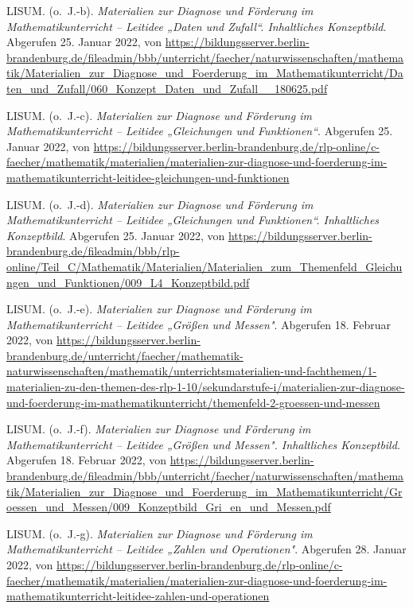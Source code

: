 \documentclass[
  ngerman,
]{scrbook}
\newlength{\cslhangindent}
\newlength{\cslentryspacingunit} %
\newenvironment{CSLReferences}[2] %
 {%
  \setlength{\parindent}{0pt}
  \ifodd #1
  \let\oldpar\par
  \def\par{\hangindent=\cslhangindent\oldpar}
  \fi
  \setlength{\parskip}{#2\cslentryspacingunit}
 }%
 {}
\theoremstyle{definition}
\theoremstyle{definition}
\theoremstyle{definition}
\theoremstyle{definition}
\theoremstyle{remark}
\begin{document}
\begin{CSLReferences}{1}{0}
\leavevmode{}%
LISUM. (o.~J.-b). \emph{Materialien zur {Diagnose} und {Förderung} im {Mathematikunterricht} -- {Leitidee} „{Daten} und {Zufall}``. {Inhaltliches} {Konzeptbild}}. Abgerufen 25. Januar 2022, von \url{https://bildungsserver.berlin-brandenburg.de/fileadmin/bbb/unterricht/faecher/naturwissenschaften/mathematik/Materialien_zur_Diagnose_und_Foerderung_im_Mathematikunterricht/Daten_und_Zufall/060_Konzept_Daten_und_Zufall__180625.pdf}

\leavevmode{}%
LISUM. (o.~J.-c). \emph{Materialien zur {Diagnose} und {Förderung} im {Mathematikunterricht} -- {Leitidee} „{Gleichungen} und {Funktionen}``}. Abgerufen 25. Januar 2022, von \url{https://bildungsserver.berlin-brandenburg.de/rlp-online/c-faecher/mathematik/materialien/materialien-zur-diagnose-und-foerderung-im-mathematikunterricht-leitidee-gleichungen-und-funktionen}

\leavevmode{}%
LISUM. (o.~J.-d). \emph{Materialien zur {Diagnose} und {Förderung} im {Mathematikunterricht} -- {Leitidee} „{Gleichungen} und {Funktionen}``. {Inhaltliches} {Konzeptbild}}. Abgerufen 25. Januar 2022, von \url{https://bildungsserver.berlin-brandenburg.de/fileadmin/bbb/rlp-online/Teil_C/Mathematik/Materialien/Materialien_zum_Themenfeld_Gleichungen_und_Funktionen/009_L4_Konzeptbild.pdf}

\leavevmode{}%
LISUM. (o.~J.-e). \emph{Materialien zur {Diagnose} und {Förderung} im {Mathematikunterricht} -- {Leitidee} „{Größen} und {Messen}"}. Abgerufen 18. Februar 2022, von \url{https://bildungsserver.berlin-brandenburg.de/unterricht/faecher/mathematik-naturwissenschaften/mathematik/unterrichtsmaterialien-und-fachthemen/1-materialien-zu-den-themen-des-rlp-1-10/sekundarstufe-i/materialien-zur-diagnose-und-foerderung-im-mathematikunterricht/themenfeld-2-groessen-und-messen}

\leavevmode{}%
LISUM. (o.~J.-f). \emph{Materialien zur {Diagnose} und {Förderung} im {Mathematikunterricht} -- {Leitidee} „{Größen} und {Messen}". {Inhaltliches} {Konzeptbild}}. Abgerufen 18. Februar 2022, von \url{https://bildungsserver.berlin-brandenburg.de/fileadmin/bbb/unterricht/faecher/naturwissenschaften/mathematik/Materialien_zur_Diagnose_und_Foerderung_im_Mathematikunterricht/Groessen_und_Messen/009_Konzeptbild_Gri_en_und_Messen.pdf}

\leavevmode{}%
LISUM. (o.~J.-g). \emph{Materialien zur {Diagnose} und {Förderung} im {Mathematikunterricht} -- {Leitidee} „{Zahlen} und {Operationen}"}. Abgerufen 28. Januar 2022, von \url{https://bildungsserver.berlin-brandenburg.de/rlp-online/c-faecher/mathematik/materialien/materialien-zur-diagnose-und-foerderung-im-mathematikunterricht-leitidee-zahlen-und-operationen}


\end{CSLReferences}
\end{document}
